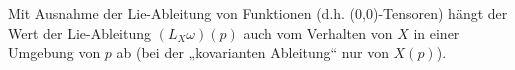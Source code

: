 \begin{nt*}
    Mit Ausnahme der Lie-Ableitung von Funktionen (d.h. (0,0)-Tensoren) hängt der Wert der Lie-Ableitung $(L_X \omega)(p)$ auch vom Verhalten von $X$ in einer Umgebung von $p$ ab (bei der „kovarianten Ableitung“ nur von $X(p)$).
\end{nt*}



